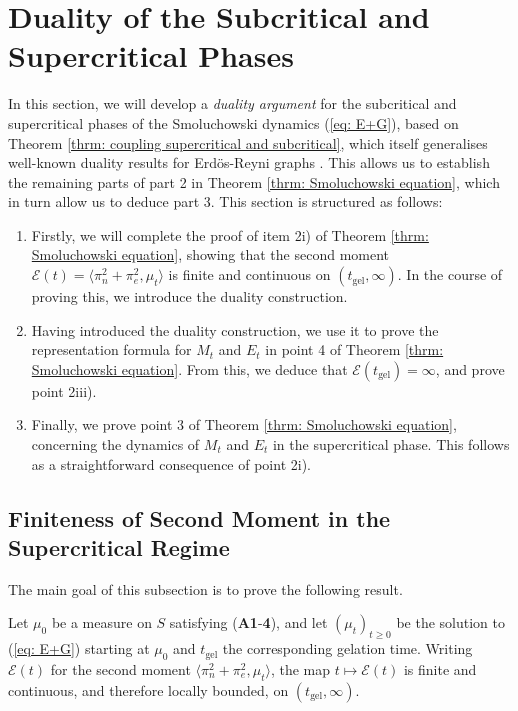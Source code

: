 \section{Duality of the Subcritical and Supercritical Phases}
\label{sec: finiteness of second moment} In this section, we will develop a \emph{duality argument} for the subcritical and supercritical phases of the Smoluchowski dynamics (\ref{eq: E+G}), based on Theorem \ref{thrm: coupling supercritical and subcritical}, which itself generalises well-known duality results for Erd\"os-Reyni graphs \cite{BB84}. This allows us to establish the remaining parts of part 2 in Theorem \ref{thrm: Smoluchowski equation}, which in turn allow us to deduce part 3. This section is structured as follows: \begin{enumerate}[label=\roman{*}).] \item Firstly, we will complete the proof of item 2i) of Theorem \ref{thrm: Smoluchowski equation}, showing that the second moment  $\mathcal{E}(t)= \langle \pi_n^2+\pi_e^2, \mu_t\rangle$ is finite and continuous on $(t_\mathrm{gel},\infty)$. In the course of proving this, we introduce the duality construction. \item Having introduced the duality construction, we use it to prove the representation formula for $M_t$ and $E_t$ in point 4 of Theorem \ref{thrm: Smoluchowski equation}. From this, we deduce that $\mathcal{E}(t_\mathrm{gel})=\infty$, and prove point 2iii). \item Finally, we prove point 3 of Theorem \ref{thrm: Smoluchowski equation}, concerning the dynamics of $M_t$ and $E_t$ in the supercritical phase. This follows as a straightforward consequence of point 2i).  \end{enumerate}
\subsection{Finiteness of Second Moment in the Supercritical Regime} The main goal of this subsection is to prove the following result. \begin{lemma}\label{lemma: second moment finite after tgel} Let $\mu_0$ be a measure on $S$ satisfying (\textbf{A1}-\textbf{4}), and let $(\mu_t)_{t\ge 0}$ be the solution to (\ref{eq: E+G}) starting at $\mu_0$ and $t_\mathrm{gel}$ the corresponding gelation time. Writing $\mathcal{E}(t)$ for the second moment $\langle \pi_n^2+\pi_e^2, \mu_t\rangle$, the map $t\mapsto \mathcal{E}(t)$ is finite and continuous, and therefore locally bounded, on  $(t_\mathrm{gel},\infty)$. \end{lemma} 

